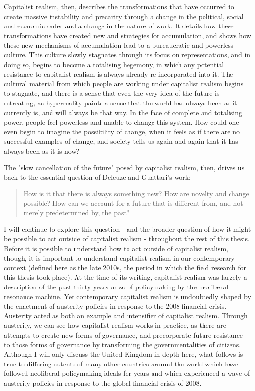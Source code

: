 Capitalist realism, then, describes the transformations that have occurred to create massive instability and precarity through a change in the political, social and economic order and a change in the nature of work. It details how these transformations have created new  and strategies for accumulation, and shows how these new mechanisms of accumulation lead to a bureaucratic and powerless culture. This culture slowly stagnates through its focus on representations, and in doing so, begins to become a totalising hegemony, in which any potential resistance to capitalist realism is always-already re-incorporated into it. The cultural material from which people are working under capitalist realism begins to stagnate, and there is a sense that even the very idea of the future is retreating, as hyperreality paints a sense that the world has always been as it currently is, and will always be that way. In the face of complete and totalising power, people feel powerless and unable to change this system. How could one even begin to imagine the possibility of change, when it feels as if there are no successful examples of change, and society tells us again and again that it has always been as it is now? 

The "slow cancellation of the future" \citep[5]{fisher_ghosts_2014} posed by capitalist realism, then, drives us back to the essential question of Deleuze and Guattari's work:

\begin{quote}
How is it that there is always something new? How are novelty and change possible? How can we account for a future that is different from, and not merely predetermined by, the past? \citep[23]{shaviro_deleuzes_2007} 
\end{quote}

I will continue to explore this question - and the broader question of how it might be possible to act outside of capitalist realism - throughout the rest of this thesis. Before it is possible to understand how to act outside of capitalist realism, though, it is important to understand capitalist realism in our contemporary context (defined here as the late 2010s, the period in which the field research for this thesis took place). At the time of its writing, capitalist realism was largely a description of the past thirty years or so of policymaking by the neoliberal resonance machine. Yet contemporary capitalist realism is undoubtedly shaped by the enactment of austerity policies in response to the 2008 financial crisis. Austerity acted as both an example and intensifier of capitalist realism. Through austerity, we can see how capitalist realism works in practice, as there are attempts to create new forms of governance, and precorporate future resistance to those forms of governance by transforming the governmentalities of citizens. Although I will only discuss the United Kingdom in depth here, what follows is true to differing extents of many other countries around the world which have followed neoliberal policymaking ideals for years and which experienced a wave of austerity policies in response to the global financial crisis of 2008.


